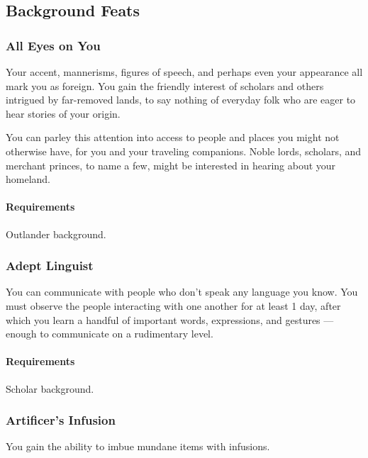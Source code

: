 \subsection*{Background Feats}

\subsubsection{All Eyes on You} \label{feat::alleyesonyou}
    Your accent, mannerisms, figures of speech, and perhaps even your appearance all mark you as foreign.
    You gain the friendly interest of scholars and others intrigued by far-removed lands, to say nothing of everyday folk who are eager to hear stories of your origin.

    You can parley this attention into access to people and places you might not otherwise have, for you and your traveling companions.
    Noble lords, scholars, and merchant princes, to name a few, might be interested in hearing about your homeland.
    \paragraph{Requirements} Outlander background.
\subsubsection{Adept Linguist} \label{feat::adeptlinguist}
    You can communicate with people who don't speak any language you know.
    You must observe the people interacting with one another for at least 1 day, after which you learn a handful of important words, expressions, and gestures --- enough to communicate on a rudimentary level.
    \paragraph{Requirements} Scholar background.
\subsubsection{Artificer's Infusion} \label{feat::artificersinfusion}
    You gain the ability to imbue mundane items with infusions.

